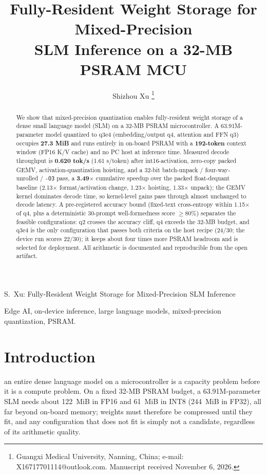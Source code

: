 \documentclass[journal,letterpaper]{IEEEtran}
\begin{document}
\title{Fully-Resident Weight Storage for Mixed-Precision\\ SLM Inference on a 32-MB PSRAM MCU}

\author{Shizhou Xu%
\thanks{Guangxi Medical University, Nanning, China; e-mail: X16717701114@outlook.com.
Manuscript received November 6, 2026.}}

%
{S.~Xu: Fully-Resident Weight Storage for Mixed-Precision SLM Inference}

\maketitle

\begin{abstract}
We show that mixed-precision quantization enables fully-resident weight storage of a dense
small language model (SLM) on a 32-MB PSRAM microcontroller. A 63.91M-parameter model
quantized to q3e4 (embedding/output q4, attention and FFN q3) occupies \textbf{27.3 MiB}
and runs entirely in on-board PSRAM with a \textbf{192-token} context window (FP16 K/V cache)
and no PC host at inference time. Measured decode throughput is \textbf{0.620 tok/s}
(1.61 s/token) after int16-activation, zero-copy packed GEMV, activation-quantization hoisting,
and a 32-bit batch-unpack / four-way-unrolled / \texttt{-O3} pass, a \textbf{3.49$\times$}
cumulative speedup over the packed float-dequant baseline (2.13$\times$ format/activation
change, 1.23$\times$ hoisting, 1.33$\times$ unpack); the GEMV kernel dominates decode time, so
kernel-level gains pass through almost unchanged to decode latency. A pre-registered accuracy
bound (fixed-text cross-entropy within 1.15$\times$ of q4, plus a deterministic 30-prompt
well-formedness score $\geq 80\%$) separates the feasible configurations: q2 crosses the
accuracy cliff, q4 exceeds the 32-MB budget, and q3e4 is the only configuration that passes both
criteria on the host recipe (24/30; the device run scores 22/30); it keeps about four times more
PSRAM headroom and is selected for deployment. All arithmetic is documented and reproducible
from the open artifact.
\end{abstract}

\begin{IEEEkeywords}
Edge AI, on-device inference, large language models, mixed-precision quantization, PSRAM.
\end{IEEEkeywords}

\section{Introduction}
 an entire dense language model on a microcontroller is a capacity
problem before it is a compute problem. On a fixed 32-MB PSRAM budget, a 63.91M-parameter
SLM needs about 122~MiB in FP16 and 61~MiB in INT8 (244~MiB in FP32), all far beyond on-board memory;
weights must therefore be compressed until they fit, and any configuration that does not fit
is simply not a candidate, regardless of its arithmetic quality.
\end{document}
